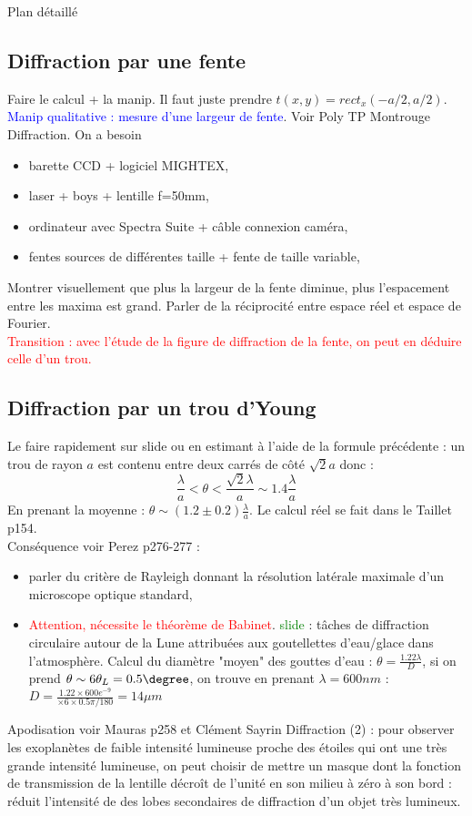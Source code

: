 \begin{reportBlock}{Plan détaillé}
  \subsection{Diffraction par une fente}
  Faire le calcul + la manip. Il faut juste prendre $t(x,y)=rect_x(-a/2,a/2)$.\\
  \textcolor{blue}{Manip qualitative : mesure d'une largeur de fente}. Voir Poly TP Montrouge Diffraction. On a besoin 
  \begin{itemize}
      \item barette CCD + logiciel MIGHTEX,
      \item laser + boys + lentille f=50mm,
      \item ordinateur avec Spectra Suite + câble connexion caméra,
      \item fentes sources de différentes taille + fente de taille variable,
  \end{itemize}
  Montrer visuellement que plus la largeur de la fente diminue, plus l'espacement entre les maxima est grand. Parler de la réciprocité entre espace réel et espace de Fourier.\\

  \textcolor{red}{Transition : avec l'étude de la figure de diffraction de la fente, on peut en déduire celle d'un trou.}
  

  \subsection{Diffraction par un trou d'Young}
  Le faire rapidement sur slide ou en estimant à l'aide de la formule précédente : un trou de rayon $a$ est contenu entre deux carrés de côté $\sqrt{2}a$ donc :
  \begin{equation}
      \frac{\lambda}{a} < \theta < \frac{\sqrt{2}\lambda}{a}\sim 1.4\frac{\lambda}{a}
  \end{equation}
  En prenant la moyenne : $\theta \sim (1.2\pm0.2)\frac{\lambda}{a}$. Le calcul réel se fait dans le Taillet p154.\\
  Conséquence voir Perez p276-277 : 
  \begin{itemize}
      \item parler du critère de Rayleigh donnant la résolution latérale maximale d'un microscope optique standard,
      \item \textcolor{red}{Attention, nécessite le théorème de Babinet}. \textcolor{green}{slide} : tâches de diffraction circulaire autour de la Lune attribuées aux goutellettes d'eau/glace dans l'atmosphère. Calcul du diamètre "moyen" des gouttes d'eau : $\theta=\frac{1.22\lambda}{D}$, si on prend $\theta\sim6\theta_{L}=0.5\degree$, on trouve en prenant $\lambda=600nm$ : $D=\frac{1.22\times 600e^{-9}}{\times6\times0.5\pi/180}=14\mu m$
  \end{itemize}
  Apodisation voir Mauras p258 et Clément Sayrin Diffraction (2) : pour observer les exoplanètes de faible intensité lumineuse proche des étoiles qui ont une très grande intensité lumineuse, on peut choisir de mettre un masque dont la fonction de transmission de la lentille décroît de l'unité en son milieu à zéro à son bord : réduit l'intensité de des lobes secondaires de diffraction d'un objet très lumineux.
  

\end{reportBlock}
